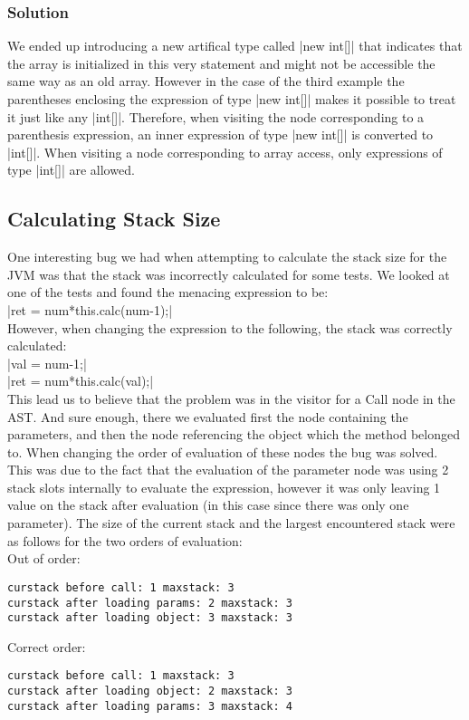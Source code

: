 \documentclass[paper=a4, fontsize=11pt]{scrartcl} %
\numberwithin{equation}{section} %
\numberwithin{figure}{section} %
\numberwithin{table}{section} %
\begin{document}
\subsubsection*{Solution}
We ended up introducing a new artifical type called |new int[]| that indicates that the array is initialized in this very statement and might not be accessible the same way as an old array. However in the case of the third example the parentheses enclosing the expression of type |new int[]| makes it possible to treat it just like any |int[]|. Therefore, when visiting the node corresponding to a parenthesis expression, an inner expression of type |new int[]| is converted to |int[]|. When visiting a node corresponding to array access, only expressions of type |int[]| are allowed.

\subsection{Calculating Stack Size}
One interesting bug we had when attempting to calculate the stack size for the JVM was that the stack was incorrectly calculated for some tests. We looked at one of the tests and found the menacing expression to be:\\

|ret = num*this.calc(num-1);|\\

However, when changing the expression to the following, the stack was correctly calculated:\\

|val = num-1;|\\
|ret = num*this.calc(val);|\\

This lead us to believe that the problem was in the visitor for a Call node in the AST. And sure enough, there we evaluated first the node containing the parameters, and then the node referencing the object which the method belonged to. When changing the order of evaluation of these nodes the bug was solved. This was due to the fact that the evaluation of the parameter node was using 2 stack slots internally to evaluate the expression, however it was only leaving 1 value on the stack after evaluation (in this case since there was only one parameter). The size of the current stack and the largest encountered stack were as follows for the two orders of evaluation:\\

Out of order:
\begin{verbatim}
curstack before call: 1 maxstack: 3
curstack after loading params: 2 maxstack: 3
curstack after loading object: 3 maxstack: 3
\end{verbatim}
Correct order:
\begin{verbatim}
curstack before call: 1 maxstack: 3
curstack after loading object: 2 maxstack: 3
curstack after loading params: 3 maxstack: 4
\end{verbatim}
\end{document}
